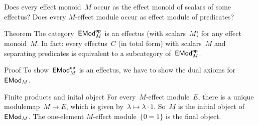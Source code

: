\documentclass[b]{subfiles}
\begin{document}
\begin{parsec}%
\begin{point}%
Does every effect monoid~$M$ occur as the effect monoid of scalars of some
    effectus?  Does every $M$-effect module occur as
        effect module of predicates?
\end{point}
\begin{point}{Theorem}%
    The category~$\mathsf{EMod}^{\mathsf{op}}_M$ is an effectus 
        (with scalars~$M$) for any effect monoid~$M$.
In fact: every effectus~$C$ (in total form)
    with scalars~$M$ and separating predicates
    is equivalent to a subcategory of~$\mathsf{EMod}^{\mathsf{op}}_M$.
\begin{point}{Proof}%
To show~$\mathsf{EMod}^{\mathsf{op}}_M$ is an effectus,
    we have to show the dual  axioms for~$\mathsf{EMod}_M$.
\begin{point}{Finite products and inital object}%
For every~$M$-effect module~$E$,
    there is a unique modulemap~$M \to E$,
    which is given by~$\lambda \mapsto \lambda \cdot 1$.
So~$M$ is the initial object of~$\mathsf{EMod}_M$.
The one-element $M$-effect module~$\{0=1\}$ is the final object.


\end{point}
\end{point}
\end{point}
\end{parsec}
\end{document}
